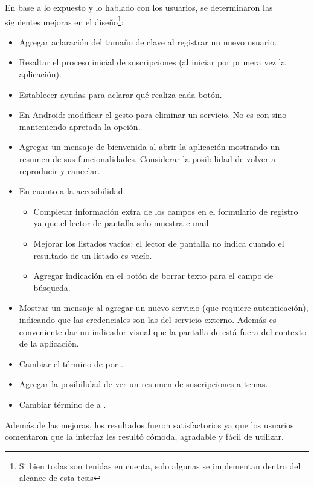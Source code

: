 
En base a lo expuesto y lo hablado con los usuarios, se determinaron las siguientes mejoras en el diseño\footnote{Si bien todas son tenidas en cuenta, solo algunas se implementan dentro del alcance de esta tesis}:
\begin{itemize}
\item Agregar aclaración del tamaño de clave al registrar un nuevo usuario. 
\item Resaltar el proceso inicial de suscripciones (al iniciar por primera vez la aplicación).
\item Establecer ayudas para aclarar qué realiza cada botón.
\item En Android: modificar el gesto para eliminar un servicio. No es con  sino manteniendo apretada la opción.
\item Agregar un mensaje de bienvenida al abrir la aplicación mostrando un resumen de sus funcionalidades. Considerar la posibilidad de volver a reproducir y cancelar.
\item En cuanto a la accesibilidad:
\begin{itemize}
\item Completar información extra de los campos en el formulario de registro ya que el lector de pantalla solo muestra e-mail.
\item Mejorar los listados vacíos: el lector de pantalla no indica cuando el resultado de un listado es vacío.
\item Agregar indicación en el botón de borrar texto para el campo de búsqueda. 
\end{itemize}
\item Mostrar un mensaje al agregar un nuevo servicio (que requiere autenticación), indicando que las credenciales son las del servicio externo. Además es conveniente dar un indicador visual que la pantalla de   está fuera del contexto de la aplicación.
\item Cambiar el término de  por .
\item Agregar la posibilidad de ver un resumen de suscripciones a temas.
\item Cambiar término de  a .
\end{itemize}

Además de las mejoras, los resultados fueron satisfactorios ya que los usuarios comentaron que la interfaz les resultó cómoda, agradable y fácil de utilizar.
